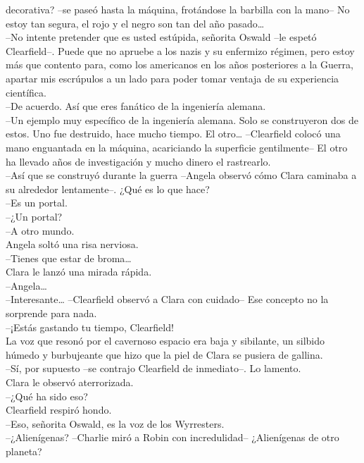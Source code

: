 decorativa? --se paseó hasta la máquina, frotándose la barbilla con la
mano-- No estoy tan segura, el rojo y el negro son tan del año
pasado\ldots{}\\
--No intente pretender que es usted estúpida, señorita Oswald --le
espetó Clearfield--. Puede que no apruebe a los nazis y su enfermizo
régimen, pero estoy más que contento para, como los americanos en los
años posteriores a la Guerra, apartar mis escrúpulos a un lado para
poder tomar ventaja de su experiencia científica.\\
--De acuerdo. Así que eres fanático de la ingeniería alemana.\\
--Un ejemplo muy específico de la ingeniería alemana. Solo se
construyeron dos de estos. Uno fue destruido, hace mucho tiempo. El
otro\ldots{} --Clearfield colocó una mano enguantada en la máquina,
acariciando la superficie gentilmente-- El otro ha llevado años de
investigación y mucho dinero el rastrearlo.\\
--Así que se construyó durante la guerra --Angela observó cómo Clara
caminaba a su alrededor lentamente--. ¿Qué es lo que hace?\\
--Es un portal.\\
--¿Un portal?\\
--A otro mundo.\\
Angela soltó una risa nerviosa.\\
--Tienes que estar de broma\ldots{}\\
Clara le lanzó una mirada rápida.\\
--Angela\ldots{}\\
--Interesante\ldots{} --Clearfield observó a Clara con cuidado-- Ese
concepto no la sorprende para nada.\\
--¡Estás gastando tu tiempo, Clearfield!\\
La voz que resonó por el cavernoso espacio era baja y sibilante, un
silbido húmedo y burbujeante que hizo que la piel de Clara se pusiera de
gallina.\\
--Sí, por supuesto --se contrajo Clearfield de inmediato--. Lo
lamento.\\
Clara le observó aterrorizada.\\
--¿Qué ha sido eso?\\
Clearfield respiró hondo.\\
--Eso, señorita Oswald, es la voz de los
Wyrresters.\\[2\baselineskip]--¿Alienígenas? --Charlie miró a Robin con
incredulidad-- ¿Alienígenas de otro planeta?\\
